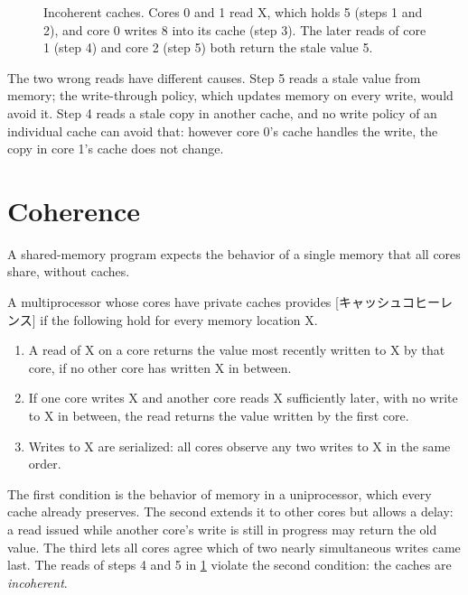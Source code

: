 \documentclass[../main.tex]{subfiles}
\begin{document}
\begin{figure}[htbp]
  \centering
  
  \caption{Incoherent caches.  Cores 0 and 1 read X, which holds 5 (steps 1
    and 2), and core 0 writes 8 into its cache (step 3).  The later reads of
    core 1 (step 4) and core 2 (step 5) both return the stale value 5.}
  \label{fig:l19-problem}
\end{figure}

The two wrong reads have different causes.  Step 5 reads a stale value from
memory; the write-through policy, which updates memory on every write, would
avoid it.  Step 4 reads a stale copy in another cache, and no write policy of
an individual cache can avoid that: however core 0's cache handles the write,
the copy in core 1's cache does not change.

\section{Coherence}
\label{sec:l19-definition}

A shared-memory program expects the behavior of a single memory that all
cores share, without caches.

\begin{definition}
  A multiprocessor whose cores have private caches provides
  [キャッシュコヒーレンス] if the following hold for
  every memory location X.
  \begin{enumerate}
    \item A read of X on a core returns the value most recently written to X
      by that core, if no other core has written X in between.
    \item If one core writes X and another core reads X sufficiently later,
      with no write to X in between, the read returns the value written by
      the first core.
    \item Writes to X are serialized: all cores observe any two writes to X
      in the same order.
  \end{enumerate}
\end{definition}

The first condition is the behavior of memory in a uniprocessor, which every
cache already preserves.  The second extends it to other cores but allows a
delay: a read issued while another core's write is still in progress may
return the old value.  The third lets all cores agree which of two nearly
simultaneous writes came last.  The reads of steps 4 and 5 in
\cref{fig:l19-problem} violate the second condition: the caches are
\emph{incoherent}.
\end{document}
